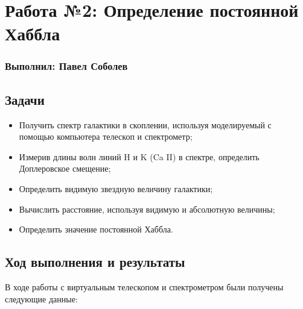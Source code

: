 




\section*{Работа №2: Определение постоянной Хаббла}
\subsubsection*{Выполнил: Павел Соболев}

\vspace{3em}

\subsection*{Задачи}

\begin{itemize}
  \setlength\itemsep{-0.1em}
  \item Получить спектр галактики в скоплении, используя моделируемый с помощью компьютера телескоп и спектрометр;
  \item Измерив длины волн линий H и K (Ca II) в спектре, определить Доплеровское смещение;
  \item Определить видимую звездную величину галактики;
  \item Вычислить расстояние, используя видимую и абсолютную величины;
  \item Определить значение постоянной Хаббла.
\end{itemize}

\subsection*{Ход выполнения и результаты}

В ходе работы с виртуальным телескопом и спектрометром были получены следующие данные:

